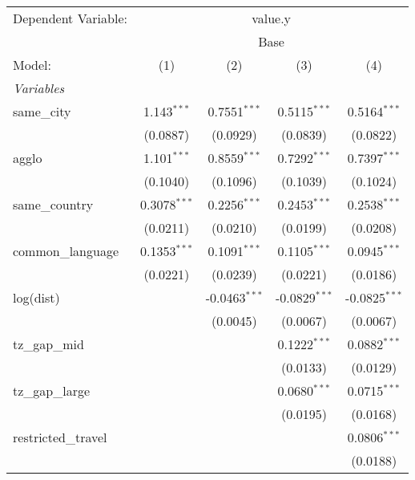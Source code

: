 \begingroup
\centering
\begin{tabular}{lcccc}
   \tabularnewline \midrule \midrule
   Dependent Variable: & \multicolumn{4}{c}{value.y}\\
    & \multicolumn{4}{c}{Base} \\ 
   Model:              & (1)            & (2)             & (3)             & (4)\\  
   \midrule
   \emph{Variables}\\
   same\_city          & 1.143$^{***}$  & 0.7551$^{***}$  & 0.5115$^{***}$  & 0.5164$^{***}$\\   
                       & (0.0887)       & (0.0929)        & (0.0839)        & (0.0822)\\   
   agglo               & 1.101$^{***}$  & 0.8559$^{***}$  & 0.7292$^{***}$  & 0.7397$^{***}$\\   
                       & (0.1040)       & (0.1096)        & (0.1039)        & (0.1024)\\   
   same\_country       & 0.3078$^{***}$ & 0.2256$^{***}$  & 0.2453$^{***}$  & 0.2538$^{***}$\\   
                       & (0.0211)       & (0.0210)        & (0.0199)        & (0.0208)\\   
   common\_language    & 0.1353$^{***}$ & 0.1091$^{***}$  & 0.1105$^{***}$  & 0.0945$^{***}$\\   
                       & (0.0221)       & (0.0239)        & (0.0221)        & (0.0186)\\   
   log(dist)           &                & -0.0463$^{***}$ & -0.0829$^{***}$ & -0.0825$^{***}$\\   
                       &                & (0.0045)        & (0.0067)        & (0.0067)\\   
   tz\_gap\_mid        &                &                 & 0.1222$^{***}$  & 0.0882$^{***}$\\   
                       &                &                 & (0.0133)        & (0.0129)\\   
   tz\_gap\_large      &                &                 & 0.0680$^{***}$  & 0.0715$^{***}$\\   
                       &                &                 & (0.0195)        & (0.0168)\\   
   restricted\_travel  &                &                 &                 & 0.0806$^{***}$\\   
                       &                &                 &                 & (0.0188)\\   

\end{tabular}
